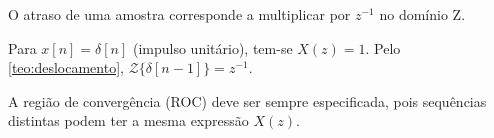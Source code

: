 \begin{corolario}
  O atraso de uma amostra corresponde a multiplicar por $z^{-1}$ no domínio Z.
\end{corolario}

\begin{exemplo}
  Para $x[n] = \delta[n]$ (impulso unitário), tem-se $X(z) = 1$.
  Pelo \cref{teo:deslocamento}, $\mathcal{Z}\{\delta[n-1]\} = z^{-1}$.
\end{exemplo}

\begin{observacao}
  A região de convergência (ROC) deve ser sempre especificada,
  pois sequências distintas podem ter a mesma expressão $X(z)$.
\end{observacao}
